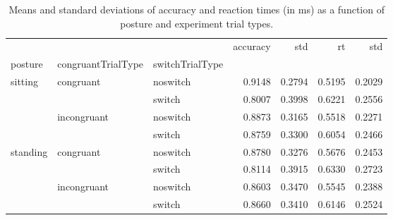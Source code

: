 \begin{table}
\centering
\caption{Means and standard deviations of accuracy and reaction times (in ms) as a function of posture and experiment trial types.}
\label{table-task-switching-replication-reaction-time}
\begin{tabular}{lllrrrr}
\toprule
         &             &        & accuracy &    std &     rt &    std \\
posture & congruantTrialType & switchTrialType &          &        &        &        \\
\midrule
sitting & congruant & noswitch &   0.9148 & 0.2794 & 0.5195 & 0.2029 \\
         &             & switch &   0.8007 & 0.3998 & 0.6221 & 0.2556 \\
         & incongruant & noswitch &   0.8873 & 0.3165 & 0.5518 & 0.2271 \\
         &             & switch &   0.8759 & 0.3300 & 0.6054 & 0.2466 \\
standing & congruant & noswitch &   0.8780 & 0.3276 & 0.5676 & 0.2453 \\
         &             & switch &   0.8114 & 0.3915 & 0.6330 & 0.2723 \\
         & incongruant & noswitch &   0.8603 & 0.3470 & 0.5545 & 0.2388 \\
         &             & switch &   0.8660 & 0.3410 & 0.6146 & 0.2524 \\
\bottomrule
\end{tabular}
\end{table}
